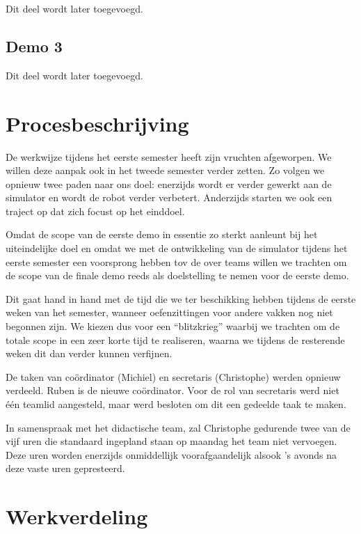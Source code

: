 \documentclass[12pt,a4paper]{report}
\begin{document}
Dit deel wordt later toegevoegd.

\section{Demo 3}

Dit deel wordt later toegevoegd.

\chapter{Procesbeschrijving}

De werkwijze tijdens het eerste semester heeft zijn vruchten afgeworpen. We willen deze aanpak ook in het tweede semester verder zetten. Zo volgen we opnieuw twee paden naar ons doel: enerzijds wordt er verder gewerkt aan de simulator en wordt de robot verder verbetert. Anderzijds starten we ook een traject op dat zich focust op het einddoel.

Omdat de scope van de eerste demo in essentie zo sterkt aanleunt bij het uiteindelijke doel en omdat we met de ontwikkeling van de simulator tijdens het eerste semester een voorsprong hebben tov de over teams willen we trachten om de scope van de finale demo reeds als doelstelling te nemen voor de eerste demo.

Dit gaat hand in hand met de tijd die we ter beschikking hebben tijdens de eerste weken van het semester, wanneer oefenzittingen voor andere vakken nog niet begonnen zijn. We kiezen dus voor een ``blitzkrieg'' waarbij we trachten om de totale scope in een zeer korte tijd te realiseren, waarna we tijdens de resterende weken dit dan verder kunnen verfijnen.

De taken van co\"ordinator (Michiel) en secretaris (Christophe) werden opnieuw verdeeld. Ruben is de nieuwe co\"ordinator. Voor de rol van secretaris werd niet \'e\'en teamlid aangesteld, maar werd besloten om dit een gedeelde taak te maken.

In samenspraak met het didactische team, zal Christophe gedurende twee van de vijf uren die standaard ingepland staan op maandag het team niet vervoegen. Deze uren worden enerzijds onmiddellijk voorafgaandelijk alsook 's avonds na deze vaste uren gepresteerd.

\chapter{Werkverdeling}
\end{document}
